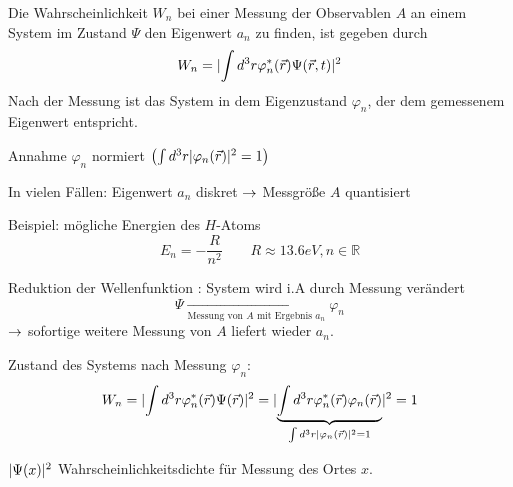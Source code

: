 Die Wahrscheinlichkeit $W_n$ bei einer Messung der Observablen $A$ an einem
System im Zustand $\Psi$ den Eigenwert $a_n$ zu finden, ist gegeben durch
\begin{equation*}
    W_n = \lvert \int d^3 r \varphi_n^*(\vec{r}) \Psi(\vec{r},t)\rvert^2
\end{equation*}
Nach der Messung ist das System in dem Eigenzustand $\varphi_n$, der dem
gemessenem Eigenwert entspricht.
\begin{bem}
    \item 
    Annahme $\varphi_n$ normiert $\left( \int d^3 r \lvert \varphi_n
    (\vec{r})\rvert^2 =1 \right)$
    \item
    In vielen Fällen: Eigenwert $a_n$ diskret $\rightarrow$ Messgröße $A$ quantisiert

    Beispiel: mögliche Energien des $H$-Atoms
    \begin{equation*}
        E_n = - \frac{R}{n^2} \qquad R \approx 13.6eV, n \in \mathbb{R}
    \end{equation*}
    \item{Reduktion der Wellenfunktion}
    \QM: System wird i.A durch Messung verändert
    \begin{equation*}
        \Psi \xrightarrow[\text{Messung von $A$ mit Ergebnis $a_n$}]{} \varphi_n
    \end{equation*}
    $\rightarrow$ sofortige weitere Messung von $A$ liefert wieder $a_n$.

    Zustand des Systems nach Messung $\varphi_n$:
    \begin{equation*}
        W_n = \lvert \int d^3 r \varphi_n^*(\vec{r}) \Psi(\vec{r}) \rvert^2
            = \lvert \underbrace{\int d^3 r \varphi_n^*(\vec{r}) 
                        \varphi_n(\vec{r})}_{\int d^3 r \lvert \varphi_n
                        (\vec{r}) \rvert^2 = 1} \rvert^2= 1
    \end{equation*}
    \item
    $\lvert \Psi(x)\rvert^2$ Wahrscheinlichkeitsdichte für Messung des Ortes $x$.


\end{bem}
